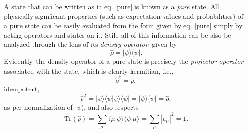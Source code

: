 \documentclass[
12pt,		%
openright,	%
twoside,  %
a4paper,			%
chapter=TITLE,		%
english,			%
french,				%
spanish,			%
brazil				%
]{USPSC-classe/USPSC}
\begin{document}
\begin{apendicesenv}
A state that can be written as in eq. \ref{pure} is known as a \textit{pure} state. All physically significant properties (such as expectation values and probabilities) of a pure state can be easily evaluated from the form given by eq. \ref{pure} simply by acting operators and states on it. Still, all of this information can be also be analyzed through the lens of its \textit{density operator}, given by
\begin{equation}\label{density}
    \hat{\rho}=|\psi\rangle\langle\psi|.
\end{equation}
Evidently, the density operator of a pure state is precisely the \textit{projector operator} associated with the state, which is clearly hermitian, i.e., 
\begin{equation}\label{hermitian}
    \hat{\rho}^{\dag}=\hat{\rho},
\end{equation}
 idempotent, 
 \begin{equation}
      \hat{\rho}^2=|\psi\rangle\langle\psi|\psi\rangle\langle\psi|=|\psi\rangle\langle\psi|=\hat{\rho},
 \end{equation}
 as per normalization of $|\psi\rangle$, and also respects
 \begin{equation}
      \text{Tr}(\hat{\rho})=\sum_{\mu}\langle{\mu}|\psi\rangle\langle\psi|{\mu}\rangle=\sum_{\mu}|a_{\mu}|^2=1.
  \end{equation}
  

\end{apendicesenv}
\end{document}

